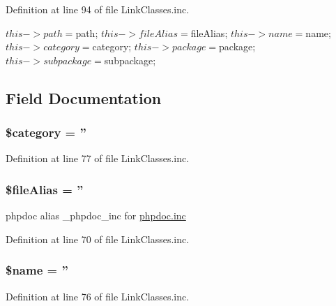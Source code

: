 \-Definition at line 94 of file \-Link\-Classes.\-inc.


\begin{DoxyCode}
    {
        $this->path       = $path;
        $this->fileAlias  = $fileAlias;
        $this->name       = $name;
        $this->category   = $category;
        $this->package    = $package;
        $this->subpackage = $subpackage;
    }
\end{DoxyCode}


\subsection{\-Field \-Documentation}
\hypertarget{classabstract_link_a18b2a8d133fa7733bf34abcc6ca2ef5b}{
\subsubsection[{\$category}]{\setlength{\rightskip}{0pt plus 5cm}\$category = ''}}\label{classabstract_link_a18b2a8d133fa7733bf34abcc6ca2ef5b}


\-Definition at line 77 of file \-Link\-Classes.\-inc.

\hypertarget{classabstract_link_ac31de7b4a69da02b039d84655a9f28e9}{
\subsubsection[{\$file\-Alias}]{\setlength{\rightskip}{0pt plus 5cm}\$file\-Alias = ''}}\label{classabstract_link_ac31de7b4a69da02b039d84655a9f28e9}
phpdoc alias \-\_\-phpdoc\-\_\-inc for \hyperlink{phpdoc_8inc}{phpdoc.\-inc} 

\-Definition at line 70 of file \-Link\-Classes.\-inc.

\hypertarget{classabstract_link_ab2fc40d43824ea3e1ce5d86dee0d763b}{
\subsubsection[{\$name}]{\setlength{\rightskip}{0pt plus 5cm}\$name = ''}}\label{classabstract_link_ab2fc40d43824ea3e1ce5d86dee0d763b}


\-Definition at line 76 of file \-Link\-Classes.\-inc.

